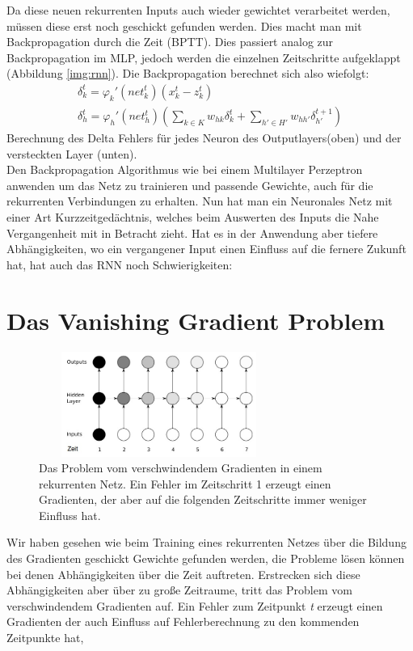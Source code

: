 Da diese neuen rekurrenten Inputs auch wieder gewichtet verarbeitet werden, müssen diese erst noch geschickt gefunden werden. Dies macht man mit Backpropagation durch die Zeit (BPTT). Dies passiert analog zur Backpropagation im MLP, jedoch werden die einzelnen Zeitschritte aufgeklappt (Abbildung \ref{img:rnn}). Die Backpropagation berechnet sich also wiefolgt:
\begin{gather}
	\delta_{k}^{t} = \varphi_{k}'(net_{k}^{t})(x_{k}^{t}-z^{t}_{k}) \\
	\delta_{h}^{t} = \varphi_{h}'(net_{h}^{t})(\sum_{k \in K}w_{hk}\delta^{t}_{k}+\sum_{h' \in H'}w_{hh'}\delta^{t+1}_{h'})
\end{gather}
Berechnung des Delta Fehlers für jedes Neuron des Outputlayers(oben) und der versteckten Layer (unten). \\ \cite{bib:rnn}
Den Backpropagation Algorithmus wie bei einem Multilayer Perzeptron anwenden um das Netz zu trainieren und passende Gewichte, auch für die rekurrenten Verbindungen zu erhalten. Nun hat man ein Neuronales Netz mit einer Art Kurzzeitgedächtnis, welches beim Auswerten des Inputs die Nahe Vergangenheit mit in Betracht zieht. Hat es in der Anwendung aber tiefere Abhängigkeiten, wo ein vergangener Input einen Einfluss auf die fernere Zukunft hat, hat auch das RNN noch Schwierigkeiten: 
\section{Das Vanishing Gradient Problem}
\begin{figure}
	\centering
	\includegraphics[width=0.7\textwidth, height=130px]{pics/vgp.jpg}	
	\caption{Das Problem vom verschwindendem Gradienten in einem rekurrenten Netz. Ein Fehler im Zeitschritt 1 erzeugt einen Gradienten, der aber auf die folgenden Zeitschritte immer weniger Einfluss hat.\cite{bib:vgp}}
	\label{img:vgp}
\end{figure}
Wir haben gesehen wie beim Training eines rekurrenten Netzes über die Bildung des Gradienten geschickt Gewichte gefunden werden, die Probleme lösen können bei denen Abhängigkeiten über die Zeit auftreten. Erstrecken sich diese Abhängigkeiten aber über zu große Zeitraume, tritt das Problem vom verschwindendem Gradienten auf. Ein Fehler zum Zeitpunkt \textit{t} erzeugt einen Gradienten der auch Einfluss auf Fehlerberechnung zu den kommenden Zeitpunkte hat, 